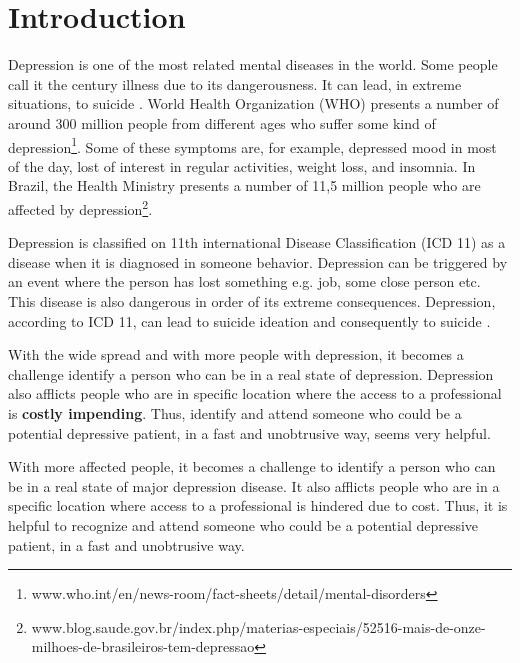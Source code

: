 \documentclass[sigconf]{acmart}
\begin{document}
\section{Introduction}
Depression is one of the most related mental diseases in the world. Some people call it the century illness due to its dangerousness. It can lead, in extreme situations, to suicide \cite{AmericanPsychiatryAssociationApa2013}. World Health Organization (WHO) presents a number of around 300 million people from different ages who suffer some kind of depression\footnote{www.who.int/en/news-room/fact-sheets/detail/mental-disorders}. Some of these symptoms are, for example, depressed mood in most of the day, lost of interest in regular activities, weight loss, and insomnia.
In Brazil, the Health Ministry presents a number of 11,5 million people who are affected by depression\footnote{www.blog.saude.gov.br/index.php/materias-especiais/52516-mais-de-onze-milhoes-de-brasileiros-tem-depressao}.

Depression is classified on 11th international Disease Classification (ICD 11) as a disease when it is diagnosed in someone behavior. Depression can be triggered by an event where the person has lost something e.g. job, some close person etc.
This disease is also dangerous in order of its extreme consequences. Depression, according to ICD 11, can lead to suicide ideation and consequently to suicide \cite{AmericanPsychiatryAssociationApa2013}.

With the wide spread and with more people with depression, it becomes a challenge identify a person who can be in a real state of depression. Depression also afflicts people who are in specific location where the access to a professional is \textbf{costly impending}. Thus, identify and attend someone who could be a potential depressive patient, in a fast and unobtrusive way, seems very helpful.

With more affected people, it becomes a challenge to identify a person who can be in a real state of major depression disease. It also afflicts people who are in a specific location where access to a professional is hindered due to cost. Thus, it is helpful to recognize and attend someone who could be a potential depressive patient, in a fast and unobtrusive way.
\end{document}
